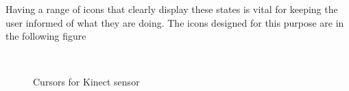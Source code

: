 \begin{enumerate}
Having a range of icons that clearly display these states is vital for keeping
the user informed of what they are doing. The icons designed for this purpose
are in the following figure

\begin{figure}[H]
  \centering
  ~
  \caption{Cursors for Kinect sensor}  
\end{figure}


\end{enumerate}


